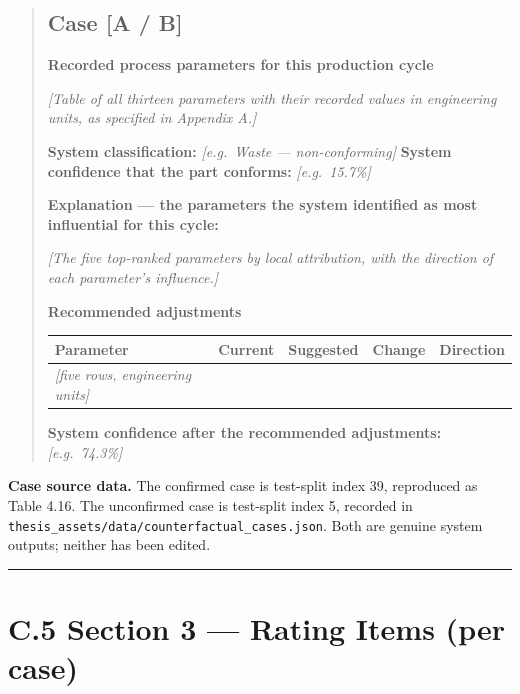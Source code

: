 \begin{quote}
\hypertarget{case-a-b}{%
\subsection{Case {[}A / B{]}}\label{case-a-b}}

\textbf{Recorded process parameters for this production cycle}

\emph{{[}Table of all thirteen parameters with their recorded values in engineering units, as specified in Appendix A.{]}}

\textbf{System classification:} \emph{{[}e.g.~Waste --- non-conforming{]}}
\textbf{System confidence that the part conforms:} \emph{{[}e.g.~15.7\%{]}}

\textbf{Explanation --- the parameters the system identified as most influential for this cycle:}

\emph{{[}The five top-ranked parameters by local attribution, with the direction of each parameter's influence.{]}}

\textbf{Recommended adjustments}

\begin{longtable}[]{@{}lllll@{}}
\toprule\noalign{}
Parameter & Current & Suggested & Change & Direction \\
\midrule\noalign{}
\endhead
\bottomrule\noalign{}
\endlastfoot
\emph{{[}five rows, engineering units{]}} & & & & \\
\end{longtable}

\textbf{System confidence after the recommended adjustments:} \emph{{[}e.g.~74.3\%{]}}
\end{quote}

\textbf{Case source data.} The confirmed case is test-split index 39, reproduced as Table 4.16. The unconfirmed case is test-split index 5, recorded in \texttt{thesis\_assets/data/counterfactual\_cases.json}. Both are genuine system outputs; neither has been edited.

\begin{center}\rule{0.5\linewidth}{0.5pt}\end{center}

\hypertarget{c.5-section-3-rating-items-per-case}{%
\section{C.5 Section 3 --- Rating Items (per case)}\label{c.5-section-3-rating-items-per-case}}


